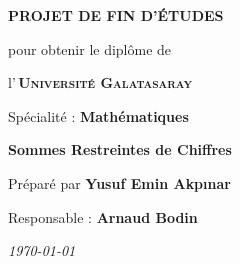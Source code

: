 \documentclass[12pt]{article}
\begin{document}
\begin{titlepage}

\begin{center}




\addtolength{\voffset}{-1cm}

\addtolength{\textheight}{2cm}

\hspace{-3cm}

\large{\textbf{PROJET DE FIN D'\'ETUDES}}

\vspace{0.5cm}

{\small pour obtenir le dipl\^{o}me de}

\vspace{0.5cm}

l'\,\textsc{\textbf{Universit\'{e} Galatasaray}}

{\small Sp\'{e}cialit\'{e} : \textbf{Math\'{e}matiques}}\\

\vspace{0.75cm}

\vspace{1.5cm}

{\Large\textbf{Sommes Restreintes de Chiffres}}


\vspace{1.25cm}

\normalsize \textrm{ Pr\'{e}par\'{e} par } \textbf{Yusuf Emin Akpınar}

\small Responsable : \textbf{ Arnaud Bodin } 

\vspace{0.75cm}

\vspace{1.75cm}

\emph{{{\today}}}

\end{center}

\end{titlepage}
\tableofcontents
\clearpage
\newpage




% 

 















\pagebreak
\nocite{*}
\normalsize


\end{document}
